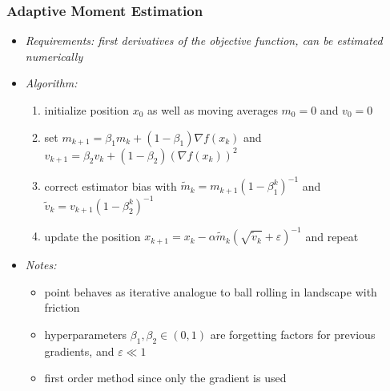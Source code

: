 	\begin{frame}
		\frametitle{Adaptive Moment Estimation}
		\begin{itemize}
			\item<2-> \itshape{Requirements:} first derivatives of the objective function, can be estimated numerically
			\item<3-> \itshape{Algorithm:}
				\begin{enumerate}
					\item<4-> initialize position $x_0$ as well as moving averages $m_0 = 0$ and $v_0 = 0$\vspace{0.5ex}
					\item<5-> set $m_{k+1} = \beta_1 m_k + (1 - \beta_1) \nabla f(x_k)$ and
							  $v_{k+1} = \beta_2 v_k + (1 - \beta_2) \left(\nabla f(x_k)\right)^2$\vspace{0.5ex}
					\item<6-> correct estimator bias with $\tilde{m}_k = m_{k+1}(1 - \beta_1^k)^{-1}$ and $\tilde{v}_k = v_{k+1}(1 - \beta_2^k)^{-1}$
					\item<7-> update the position $x_{k+1} = x_k - \alpha \tilde{m}_k \left(\sqrt{\tilde{v}_k} + \varepsilon\right)^{-1}$ and repeat
				\end{enumerate}
			\item<8-> \itshape{Notes:}
				\begin{itemize}
					\item<9-> point behaves as iterative analogue to ball rolling in landscape with friction
					\item<10-> hyperparameters $\beta_1, \beta_2 \in (0,1)$ are forgetting factors for previous gradients, and $\varepsilon \ll 1$ 
					\item<11-> first order method since only the gradient is used
				\end{itemize}
		\end{itemize}
	\end{frame}

